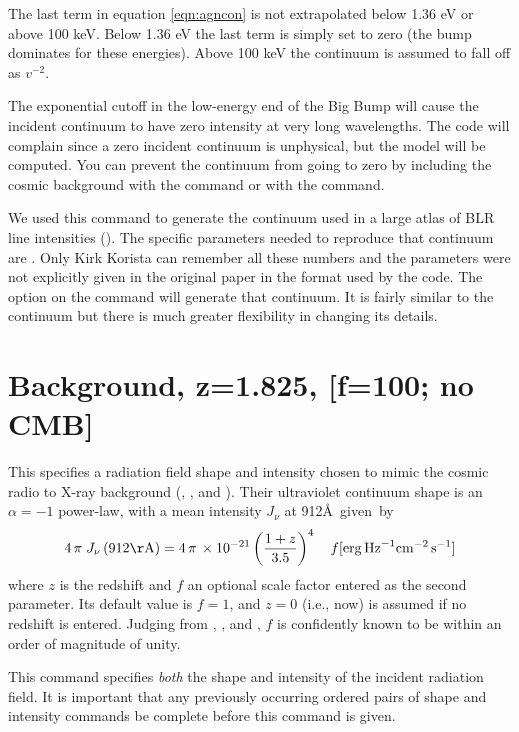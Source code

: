 The last term in equation \ref{eqn:agncon} is not extrapolated
below 1.36 eV or above 100 keV.
Below 1.36 eV the last term is simply set to zero (the bump
dominates for these energies).
Above 100 keV the continuum is assumed to
fall off as $v^{-2}$.

The exponential cutoff in the low-energy end of the Big Bump will cause
the incident continuum to have zero intensity at very long wavelengths.
The code will complain since a zero incident continuum is unphysical, but
the model will be computed.
You can prevent the continuum from going to
zero by including the cosmic background with the
 command or with the  command.

We used this command to generate the continuum used in a large atlas
of BLR line intensities (\citealp{KoristaBaldwin1997}).
The specific parameters
needed to reproduce that continuum are
.  Only
Kirk Korista can remember all these numbers and the parameters were not
explicitly given in the original paper in the format used by the code.
The  option on the  command will
generate that continuum.
It is fairly
similar to the \citet{Mathews1987} continuum but there is
much greater
flexibility in changing its details.

\section{Background, z=1.825, [f=100; no CMB]}

This specifies a radiation field shape and intensity
chosen to mimic the cosmic
radio to X-ray background (\citealp{Ostriker1983}, \citealp{Ikeuchi1986}, and \citealp{Vedel1994}).
Their ultraviolet
continuum shape is an $\alpha = -1$ power-law, with a mean intensity
$J_\nu$ at 912\AA\ given~by
\begin{equation}
4\,\pi \;J_\nu  \left( {912{\mathrm{{\AA}}}} \right) = 4\,\pi \, \times 10^{
- 21} \left( {\frac{{1 + z}}{{3.5}}} \right)^4 \quad f [\mathrm{erg\, Hz}^{-1}
\mathrm{cm}^{-2} \, \mathrm{s}^{-1}]
\end{equation}
where $z$ is the redshift and $f$ an optional scale factor entered as
the second parameter.
Its default value is $f = 1$, and $z = 0$ (i.e., now) is assumed
if no redshift is entered.
Judging from \citet{Bechtold1987}, \citet{Bajtlik1988}, and \citet{Vedel1994},
$f$ is confidently known to be within an order of magnitude of unity.

This command specifies \emph{both} the shape and intensity
of the incident radiation field.
It is important that any previously occurring ordered pairs of shape and
intensity commands be complete before this command is given.

